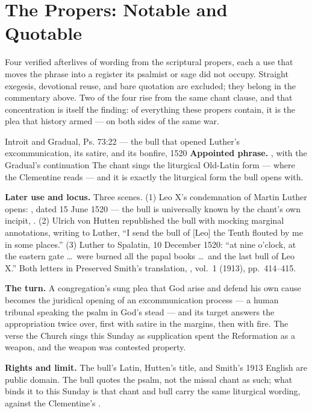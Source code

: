 \sectionguard
\section*{The Propers: Notable and Quotable}

Four verified afterlives of wording from the scriptural propers, each a use
that moves the phrase into a register its psalmist or sage did not occupy.
Straight exegesis, devotional reuse, and bare quotation are excluded; they
belong in the commentary above. Two of the four rise from the same chant
clause, and that concentration is itself the finding: of everything these
propers contain, it is the plea  that history armed --- on both sides of the same war.

\begin{afterlife}{Introit and Gradual, Ps. 73:22 --- the bull that opened Luther's excommunication, its satire, and its bonfire, 1520}
\textbf{Appointed phrase.} ,
with the Gradual's continuation  The chant sings the
liturgical Old-Latin form ---  where the Clementine reads
 --- and it is exactly the liturgical form the bull opens with.

\textbf{Later use and locus.} Three scenes. (1) Leo X's condemnation of
Martin Luther opens: ,
dated 15 June 1520 --- the bull is universally known by the chant's own
incipit, . (2) Ulrich von Hutten republished the bull
with mocking marginal annotations, writing to Luther, ``I send the bull of
[Leo] the Tenth flouted by me in some places.'' (3) Luther to Spalatin,
10 December 1520: ``at nine o'clock, at the eastern gate \dots\ were burned
all the papal books \dots\ and the last bull of Leo X.'' Both letters in
Preserved Smith's translation, , vol.~1 (1913),
pp.~414--415.

\textbf{The turn.} A congregation's sung plea that God arise and defend his
own cause becomes the juridical opening of an excommunication process --- a
human tribunal speaking the psalm in God's stead --- and its target answers
the appropriation twice over, first with satire in the margins, then with
fire. The verse the Church sings this Sunday as supplication spent the
Reformation as a weapon, and the weapon was contested property.

\textbf{Rights and limit.} The bull's Latin, Hutten's title, and Smith's 1913
English are public domain. The bull quotes the psalm, not the missal chant as
such; what binds it to this Sunday is that chant and bull carry the same
liturgical wording,  against the Clementine's .
\end{afterlife}

